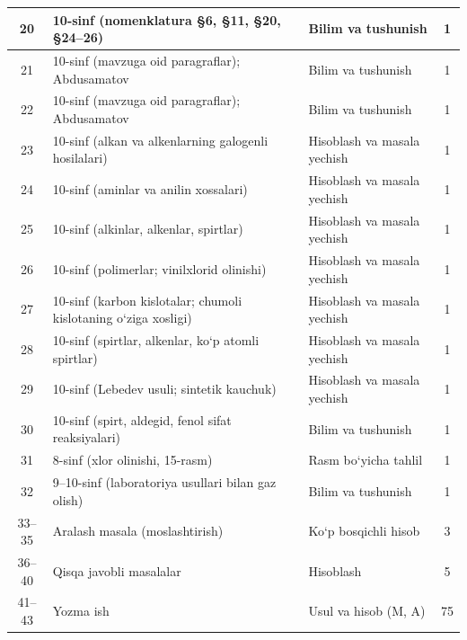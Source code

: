 \documentclass[11pt,a4paper]{article}
\begin{document}
{\begin{longtable}{|c|p{7.2cm}|p{5.4cm}|c|}
20 & 10-sinf (nomenklatura \S{}6, \S{}11, \S{}20, \S{}24--26) & Bilim va tushunish & 1\\\hline
21 & 10-sinf (mavzuga oid paragraflar); Abdusamatov & Bilim va tushunish & 1\\\hline
22 & 10-sinf (mavzuga oid paragraflar); Abdusamatov & Bilim va tushunish & 1\\\hline
23 & 10-sinf (alkan va alkenlarning galogenli hosilalari) & Hisoblash va masala yechish & 1\\\hline
24 & 10-sinf (aminlar va anilin xossalari) & Hisoblash va masala yechish & 1\\\hline
25 & 10-sinf (alkinlar, alkenlar, spirtlar) & Hisoblash va masala yechish & 1\\\hline
26 & 10-sinf (polimerlar; vinilxlorid olinishi) & Hisoblash va masala yechish & 1\\\hline
27 & 10-sinf (karbon kislotalar; chumoli kislotaning o`ziga xosligi) & Hisoblash va masala yechish & 1\\\hline
28 & 10-sinf (spirtlar, alkenlar, ko`p atomli spirtlar) & Hisoblash va masala yechish & 1\\\hline
29 & 10-sinf (Lebedev usuli; sintetik kauchuk) & Hisoblash va masala yechish & 1\\\hline
30 & 10-sinf (spirt, aldegid, fenol sifat reaksiyalari) & Bilim va tushunish & 1\\\hline
31 & 8-sinf (xlor olinishi, 15-rasm) & Rasm bo`yicha tahlil & 1\\\hline
32 & 9--10-sinf (laboratoriya usullari bilan gaz olish) & Bilim va tushunish & 1\\\hline
33--35 & Aralash masala (moslashtirish) & Ko`p bosqichli hisob & 3\\\hline
36--40 & Qisqa javobli masalalar & Hisoblash & 5\\\hline
41--43 & Yozma ish & Usul va hisob (M, A) & 75\\\hline
\end{longtable}}
\end{document}

